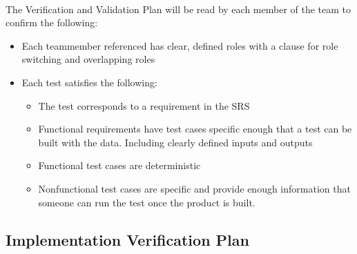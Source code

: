 \documentclass[12pt, titlepage]{article}
\begin{document}
\\
The Verification and Validation Plan will be read by each member of the team to confirm the following:
\begin{itemize}
\item Each teammember referenced has clear, defined roles with a clause for role switching and overlapping roles
\item Each test satisfies the following:
\begin{itemize}
\item The test corresponds to a requirement in the SRS
\item Functional requirements have test cases specific enough that a test can be built with the data. Including clearly defined inputs and outputs
\item Functional test cases are deterministic
\item Nonfunctional test cases are specific and provide enough information that someone can run the test once the product is built. 
\end{itemize}

\end{itemize}




\subsection{Implementation Verification Plan}



\end{document}

